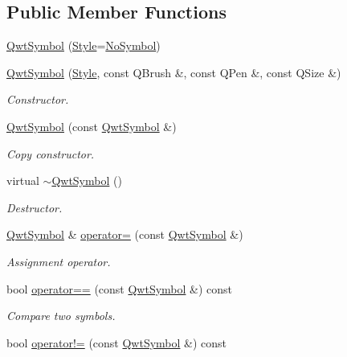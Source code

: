 \subsection*{Public Member Functions}
\begin{DoxyCompactItemize}
\item 
\hyperlink{class_qwt_symbol_a710105d32ed915db46e4dbddc9cf6dc4}{Qwt\-Symbol} (\hyperlink{class_qwt_symbol_a62f457952470c2076962e83ef2c24d2f}{Style}=\hyperlink{class_qwt_symbol_a62f457952470c2076962e83ef2c24d2fac3089b3993834683204a7bda52e763d3}{No\-Symbol})
\item 
\hyperlink{class_qwt_symbol_a3fb872dc1cf5841df25ad6cba7fe9329}{Qwt\-Symbol} (\hyperlink{class_qwt_symbol_a62f457952470c2076962e83ef2c24d2f}{Style}, const Q\-Brush \&, const Q\-Pen \&, const Q\-Size \&)
\begin{DoxyCompactList}\small\item\em Constructor. \end{DoxyCompactList}\item 
\hyperlink{class_qwt_symbol_a810e601ecb625cd28739ae39c38b1f2a}{Qwt\-Symbol} (const \hyperlink{class_qwt_symbol}{Qwt\-Symbol} \&)
\begin{DoxyCompactList}\small\item\em Copy constructor. \end{DoxyCompactList}\item 
virtual \hyperlink{class_qwt_symbol_a5a30269273545d5ed25f7116a421eda2}{$\sim$\-Qwt\-Symbol} ()
\begin{DoxyCompactList}\small\item\em Destructor. \end{DoxyCompactList}\item 
\hyperlink{class_qwt_symbol}{Qwt\-Symbol} \& \hyperlink{class_qwt_symbol_a7d314d0b4762ed3a1ed2f0314630e39e}{operator=} (const \hyperlink{class_qwt_symbol}{Qwt\-Symbol} \&)
\begin{DoxyCompactList}\small\item\em Assignment operator. \end{DoxyCompactList}\item 
bool \hyperlink{class_qwt_symbol_a3444517213bf5296dd9d2a78bcc5209a}{operator==} (const \hyperlink{class_qwt_symbol}{Qwt\-Symbol} \&) const 
\begin{DoxyCompactList}\small\item\em Compare two symbols. \end{DoxyCompactList}\item 
bool \hyperlink{class_qwt_symbol_aaa6c97c7ba1b8e7a7cce580ee788e620}{operator!=} (const \hyperlink{class_qwt_symbol}{Qwt\-Symbol} \&) const 

\end{DoxyCompactItemize}
